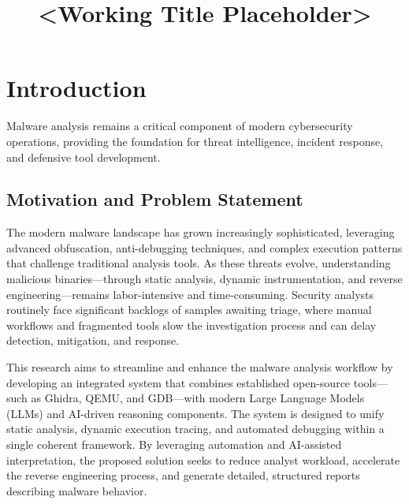 \documentclass[conference]{IEEEtran}
\begin{document}
\title{<Working Title Placeholder>}

\author{
}

\maketitle

\begin{abstract}
\end{abstract}

\section{Introduction}
Malware analysis remains a critical component of modern cybersecurity operations, providing the foundation for threat intelligence, incident response, and defensive tool development.

\subsection{Motivation and Problem Statement}
The modern malware landscape has grown increasingly sophisticated, leveraging advanced obfuscation, anti-debugging techniques, and complex execution patterns that challenge traditional analysis tools. As these threats evolve, understanding malicious binaries—through static analysis, dynamic instrumentation, and reverse engineering—remains labor-intensive and time-consuming. Security analysts routinely face significant backlogs of samples awaiting triage, where manual workflows and fragmented tools slow the investigation process and can delay detection, mitigation, and response.

This research aims to streamline and enhance the malware analysis workflow by developing an integrated system that combines established open-source tools—such as Ghidra, QEMU, and GDB—with modern Large Language Models (LLMs) and AI-driven reasoning components. The system is designed to unify static analysis, dynamic execution tracing, and automated debugging within a single coherent framework. By leveraging automation and AI-assisted interpretation, the proposed solution seeks to reduce analyst workload, accelerate the reverse engineering process, and generate detailed, structured reports describing malware behavior.
\end{document}
